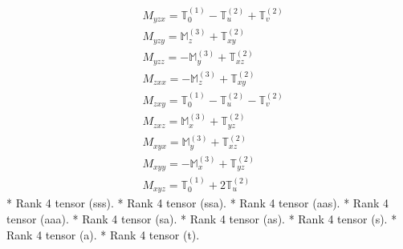 \documentclass[fleqn,8pt,landscape]{jsarticle}
\begin{document}
\begin{align*}
& M_{yzx} = \mathbb{T}_{0}^{(1)} - \mathbb{T}_{u}^{(2)} + \mathbb{T}_{v}^{(2)} \\
& M_{yzy} = \mathbb{M}_{z}^{(3)} + \mathbb{T}_{xy}^{(2)} \\
& M_{yzz} = - \mathbb{M}_{y}^{(3)} + \mathbb{T}_{xz}^{(2)} \\
& M_{zxx} = - \mathbb{M}_{z}^{(3)} + \mathbb{T}_{xy}^{(2)} \\
& M_{zxy} = \mathbb{T}_{0}^{(1)} - \mathbb{T}_{u}^{(2)} - \mathbb{T}_{v}^{(2)} \\
& M_{zxz} = \mathbb{M}_{x}^{(3)} + \mathbb{T}_{yz}^{(2)} \\
& M_{xyx} = \mathbb{M}_{y}^{(3)} + \mathbb{T}_{xz}^{(2)} \\
& M_{xyy} = - \mathbb{M}_{x}^{(3)} + \mathbb{T}_{yz}^{(2)} \\
& M_{xyz} = \mathbb{T}_{0}^{(1)} + 2 \mathbb{T}_{u}^{(2)}
\end{align*}
* Rank 4 tensor (sss).
* Rank 4 tensor (ssa).
* Rank 4 tensor (aas).
* Rank 4 tensor (aaa).
* Rank 4 tensor (sa).
* Rank 4 tensor (as).
* Rank 4 tensor (s).
* Rank 4 tensor (a).
* Rank 4 tensor (t).
\end{document}
